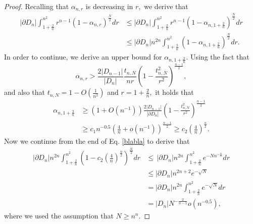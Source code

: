 \documentclass[10pt, twoside, leqno]{article}
\theoremstyle{definition}
\numberwithin{equation}{section}
\begin{document}
\begin{proof}
Recalling that $ \alpha_{n,r} $ is decreasing in $ r, $ we derive that
\begin{equation}\label{blabla}
\begin{aligned}
|\partial D_{n}|\int_{1+\frac{2}{n}}^{n^{2}}r^{n-1}\left(1-\alpha_{n,r}\right)^{\frac{N}{2}}dr&\leq
|\partial D_{n}|\int_{1+\frac{2}{n}}^{n^{2}}r^{n-1}\left(1-\alpha_{n,1+\frac 2n}\right)^{\frac{N}{2}}dr\\
&\leq|\partial D_{n}|n^{2n}\int_{1+\frac{2}{n}}^{n^{2}}\left(1-\alpha_{n,1+\frac 2n}\right)^{\frac{N}{2}}dr.
\end{aligned}
\end{equation}
In order to continue, we derive an upper bound for $ \alpha_{n,1+\frac 2n} .$ Using the fact that
\[
\alpha_{n,r} > \frac{2|D_{n-1}|}{|D_n|}\frac {t_{n,N}}{nr} \left(1-\frac{t_{n,N}^2}{r^2}\right)^{\frac{n-1}{2}},
\]
and also that $ t_{n,N} = 1-O\left(\frac 1{n^2}\right) $ and  $r = 1+\frac{2}{n},$ it holds that
\begin{equation*}
\begin{aligned}\alpha_{n,1+\frac{2}{n}} & \geq\left(1+O\left(n^{-1}\right)\right)\frac{2|D_{n-1}|}{|\partial D_{n}|}\left(1-\frac{t_{n,N}^{2}}{r^{2}}\right)^{\frac{n-1}{2}}\\
& \geq c_{1}n^{-0.5}\left(\frac{4}{n}+o\left(n^{-1}\right)\right)^{\frac{n-1}{2}}\geq c_{2}\left(\frac{4}{n}\right)^{\frac{n}{2}}.
\end{aligned}
\end{equation*}
Now we continue from the end of Eq. \eqref{blabla} to derive that
\begin{equation}
\begin{aligned}  |\partial D_{n}|n^{2n}\int_{1+\frac{2}{n}}^{n^{2}}\left(1-c_{2}\left(\frac{4}{n}\right)^{\frac{n}{2}}\right)^{\frac{N}{2}}dr&\leq\,|\partial D_{n}|n^{2n}\int_{1+\frac{2}{n}}^{n^{2}}e^{-Nn^{-\frac{n}{2}}}dr\\
&\leq  |\partial D_{n}|n^{2n+2}e^{-\sqrt{N}}\\
 &=|\partial D_{n}|n^{2n}\int_{1+\frac{2}{n}}^{n^{2}}e^{-\sqrt{N}}dr\\
 &=|D_{n}|N^{-\frac{2}{n-1}}o\left(n^{-0.5}\right),
\end{aligned}
\end{equation}
where we used the assumption that $ N\geq n^n.$ 

\end{proof}
\end{document}
